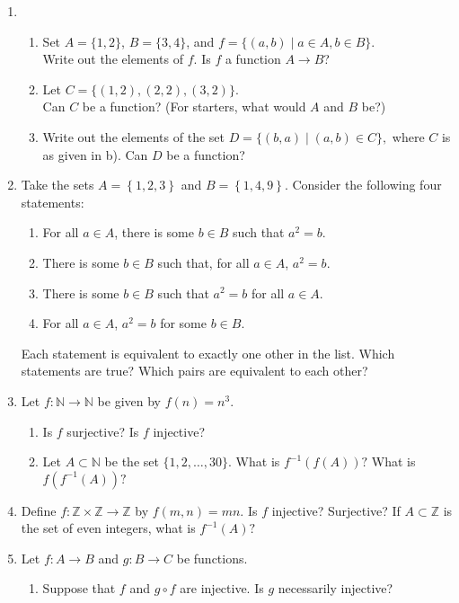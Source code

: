 \documentclass[11pt]{article}
\newcommand{\bbN}{\mathbb{N}}
\newcommand{\bbZ}{\mathbb{Z}}
\theoremstyle{definition}
\numberwithin{equation}{subsection}
\begin{document}
\begin{enumerate}
\item  
\begin{enumerate}
\item Set
$A = \{1,2\}$, 
$B = \{3,4\}$, and
$f = \{(a,b) \mid a\in A, b \in B \}$.  \\
Write out the elements of $f$.  Is $f$ a function $A \to B$?

\item Let $C=\{(1,2),(2,2),(3,2)\}$. \\
Can $C$ be a function?  (For starters, what would $A$ and $B$ be?)

\item Write out the elements of the set $D= \{(b,a) \mid (a,b) \in C\}, $ where $C$ is as given in b). Can $D$ be a function?  
\end{enumerate}


\item Take the sets $A=\left\{1,2,3\right\}$ and $B=\left\{1,4,9\right\}$. Consider the following four statements:
\begin{enumerate}
\item For all $a\in A$, there is some $b\in B$ such that $a^2=b$.
\item There is some $b\in B$ such that, for all $a\in A$, $a^2=b$.
\item There is some $b\in B$ such that $a^2=b$ for all $a\in A$.
\item For all $a\in A$, $a^2=b$ for some $b\in B$.
\end{enumerate}
Each statement is equivalent to exactly one other in the list. Which statements are true? Which pairs are equivalent to each other?


\item
Let $f:\bbN\rightarrow\bbN$ be given by $f(n)=n^3.$
\begin{enumerate}
\item Is $f$ surjective?  Is $f$ injective?
\item Let $A\subset\bbN$ be the set $\{1,2,\ldots,30\}.$  What is $f^{-1}(f(A))?$  What is
$f(f^{-1}(A))?$
\end{enumerate}


\item 

Define $f:\bbZ\times\bbZ\rightarrow\bbZ$ by $f(m,n)=mn.$  Is $f$ injective?  Surjective?  If
$A\subset \bbZ$ is the set of even integers, what is $f^{-1}(A)?$


\item Let $f:A\to B$ and $g:B\to C$ be functions.
\begin{enumerate}
\item Suppose that $f$ and $g\circ f$ are injective. Is $g$ necessarily injective?


\end{enumerate}
\end{enumerate}
\end{document}
